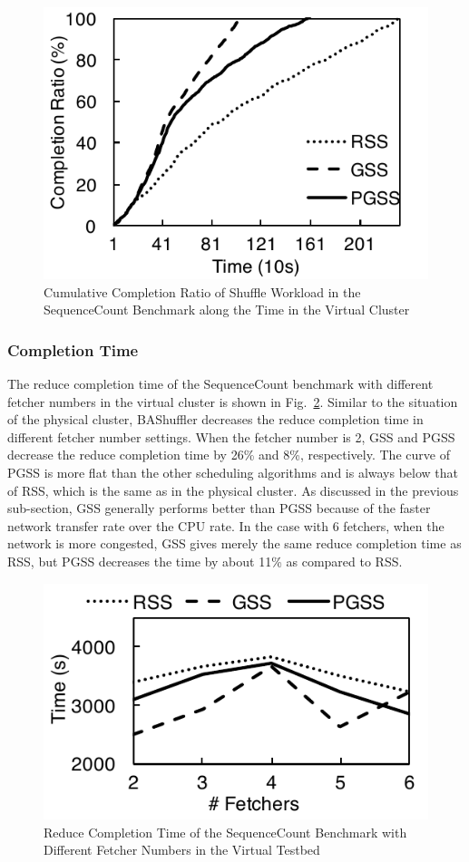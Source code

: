 \documentclass[10pt,journal,compsoc]{IEEEtran}
\begin{document}
\begin{figure}[!t]
\centering
\includegraphics[width=0.7\columnwidth,height=0.4\columnwidth]{figure9}
\caption{Cumulative Completion Ratio of Shuffle Workload in the SequenceCount Benchmark along the Time in the Virtual Cluster}
\label{fig:r_vshuffle_timeline}
\end{figure}

\subsubsection{Completion Time}
The reduce completion time of the SequenceCount benchmark with different fetcher numbers in the virtual cluster is shown in Fig.~\ref{fig:r_vsequence}. 
Similar to the situation of the physical cluster,
BAShuffler decreases the reduce
completion time in different fetcher number settings.
When the fetcher number is 2, GSS and PGSS decrease the reduce
completion time by 26\% and 8\%, respectively.
The curve of PGSS is more flat than the other scheduling algorithms and is always below that of RSS, which is the same as in the physical cluster.
As discussed in the previous sub-section, GSS generally performs better than PGSS
because of the faster network transfer rate over the CPU rate. 
In the case with 6 fetchers, when the network is more congested, GSS gives merely the same reduce completion time as RSS, but PGSS
decreases the time by about 11\% as compared to RSS. 



\begin{figure}[!t]
\centering
\includegraphics[width=0.7\columnwidth,height=0.4\columnwidth]{figure10}
\caption{Reduce Completion Time of the SequenceCount Benchmark with Different Fetcher Numbers
in the Virtual Testbed}
\label{fig:r_vsequence}
\end{figure}
\end{document}
